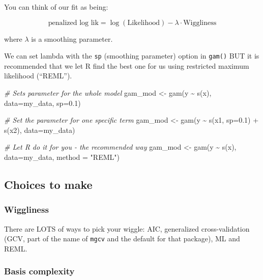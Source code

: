 \documentclass[
  openany]{book}
\newenvironment{Shaded}{\begin{snugshade}}{\end{snugshade}}
\newcommand{\AttributeTok}[1]{\textcolor[rgb]{0.77,0.63,0.00}{#1}}
\newcommand{\CommentTok}[1]{\textcolor[rgb]{0.56,0.35,0.01}{\textit{#1}}}
\newcommand{\FloatTok}[1]{\textcolor[rgb]{0.00,0.00,0.81}{#1}}
\newcommand{\FunctionTok}[1]{\textcolor[rgb]{0.00,0.00,0.00}{#1}}
\newcommand{\NormalTok}[1]{#1}
\newcommand{\OtherTok}[1]{\textcolor[rgb]{0.56,0.35,0.01}{#1}}
\newcommand{\SpecialCharTok}[1]{\textcolor[rgb]{0.00,0.00,0.00}{#1}}
\newcommand{\StringTok}[1]{\textcolor[rgb]{0.31,0.60,0.02}{#1}}
\begin{document}
You can think of our fit as being:

\[\text{penalized log lik} =\log(\text{Likelihood}) - \lambda \cdot \text{Wiggliness}\]

where \(\lambda\) is a smoothing parameter.

We can set lambda with the \texttt{sp} (smoothing parameter) option in \texttt{gam()} BUT it is recommended that we let R find the best one for us using restricted maximum likelihood (``REML'').

\begin{Shaded}
\begin{Highlighting}[]
\CommentTok{\# Sets parameter for the whole model}
\NormalTok{gam\_mod }\OtherTok{\textless{}{-}} \FunctionTok{gam}\NormalTok{(y }\SpecialCharTok{\textasciitilde{}} \FunctionTok{s}\NormalTok{(x), }\AttributeTok{data=}\NormalTok{my\_data, }\AttributeTok{sp=}\FloatTok{0.1}\NormalTok{) }

\CommentTok{\# Set the parameter for one specific term}
\NormalTok{gam\_mod }\OtherTok{\textless{}{-}} \FunctionTok{gam}\NormalTok{(y }\SpecialCharTok{\textasciitilde{}} \FunctionTok{s}\NormalTok{(x1, }\AttributeTok{sp=}\FloatTok{0.1}\NormalTok{) }\SpecialCharTok{+} \FunctionTok{s}\NormalTok{(x2), }\AttributeTok{data=}\NormalTok{my\_data) }

\CommentTok{\# Let R do it for you {-} the recommended way}
\NormalTok{gam\_mod }\OtherTok{\textless{}{-}} \FunctionTok{gam}\NormalTok{(y }\SpecialCharTok{\textasciitilde{}} \FunctionTok{s}\NormalTok{(x), }\AttributeTok{data=}\NormalTok{my\_data, }\AttributeTok{method =} \StringTok{"REML"}\NormalTok{)}
\end{Highlighting}
\end{Shaded}

\hypertarget{choices-to-make}{%
\subsection{Choices to make}\label{choices-to-make}}

\hypertarget{wiggliness}{%
\subsubsection{Wiggliness}\label{wiggliness}}

There are LOTS of ways to pick your wiggle: AIC, generalized cross-validation (GCV, part of the name of \texttt{mgcv} and the default for that package), ML and REML.

\hypertarget{basis-complexity}{%
\subsubsection{Basis complexity}\label{basis-complexity}}
\end{document}
